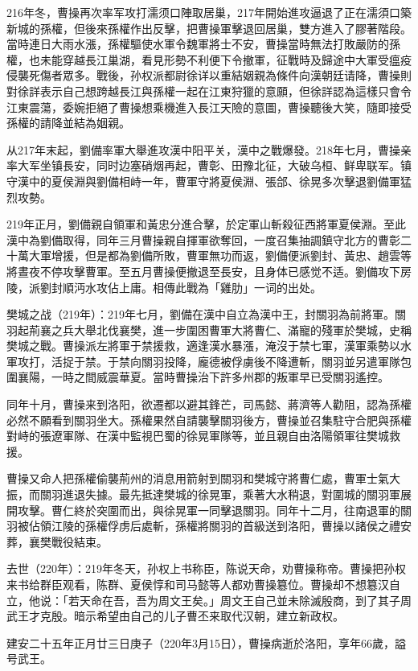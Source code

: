 216年冬，曹操再次率军攻打濡须口陣取居巢，217年開始進攻逼退了正在濡須口築新城的孫權，但後來孫權作出反擊，把曹操軍擊退回居巢，雙方進入了膠著階段。當時連日大雨水漲，孫權驅使水軍令魏軍將士不安，曹操當時無法打敗嚴防的孫權，也未能穿越長江巢湖，看見形勢不利便下令撤軍，征戰時及歸途中大軍受瘟疫侵襲死傷者眾多。戰後，孙权派都尉徐详以重結姻親為條件向漢朝廷请降，曹操則對徐詳表示自己想跨越長江與孫權一起在江東狩獵的意願，但徐詳認為這樣只會令江東震蕩，委婉拒絕了曹操想乘機進入長江天險的意圖，曹操聽後大笑，隨即接受孫權的請降並結為姻親。

从217年末起，劉備率軍大舉進攻漢中阳平关，漢中之戰爆發。218年七月，曹操亲率大军坐镇長安，同时边塞硝烟再起，曹彰、田豫北征，大破乌桓、鲜卑联军。镇守漢中的夏侯淵與劉備相峙一年，曹軍守將夏侯淵、張郃、徐晃多次擊退劉備軍猛烈攻勢。

219年正月，劉備親自領軍和黃忠分進合擊，於定軍山斬殺征西將軍夏侯淵。至此漢中為劉備取得，同年三月曹操親自揮軍欲奪回，一度召集抽調鎮守北方的曹彰二十萬大軍增援，但是都為劉備所敗，曹軍無功而返，劉備便派劉封、黃忠、趙雲等將晝夜不停攻擊曹軍。至五月曹操便撤退至長安，且身体已感觉不适。劉備攻下房陵，派劉封順沔水攻佔上庸。相傳此戰為「雞肋」一词的出处。

樊城之战（219年）：219年七月，劉備在漢中自立為漢中王，封關羽為前將軍。關羽起荊襄之兵大舉北伐襄樊，進一步圍困曹軍大將曹仁、滿寵的殘軍於樊城，史稱樊城之戰。曹操派左將軍于禁援救，適逢漢水暴漲，淹沒于禁七軍，漢軍乘勢以水軍攻打，活捉于禁。于禁向關羽投降，龐德被俘虜後不降遭斬，關羽並另遣軍隊包圍襄陽，一時之間威震華夏。當時曹操治下許多州郡的叛軍早已受關羽遙控。

同年十月，曹操来到洛阳，欲遷都以避其鋒芒，司馬懿、蔣濟等人勸阻，認為孫權必然不願看到關羽坐大。孫權果然自請襲擊關羽後方，曹操並召集駐守合肥與孫權對峙的張遼軍隊、在漢中監視巴蜀的徐晃軍隊等，並且親自由洛陽領軍往樊城救援。

曹操又命人把孫權偷襲荊州的消息用箭射到關羽和樊城守將曹仁處，曹軍士氣大振，而關羽進退失據。最先抵達樊城的徐晃軍，乘著大水稍退，對圍城的關羽軍展開攻擊。曹仁終於突圍而出，與徐晃軍一同擊退關羽。同年十二月，往南退軍的關羽被佔領江陵的孫權俘虏后處斬，孫權將關羽的首級送到洛阳，曹操以諸侯之禮安葬，襄樊戰役結束。

去世（220年）：219年冬天，孙权上书称臣，陈说天命，劝曹操称帝。曹操把孙权来书给群臣观看，陈群、夏侯惇和司马懿等人都劝曹操簒位。曹操却不想簒汉自立，他说：「若天命在吾，吾为周文王矣。」周文王自己並未除滅殷商，到了其子周武王才克殷。暗示希望由自己的儿子曹丕来取代汉朝，建立新政权。

建安二十五年正月廿三日庚子（220年3月15日），曹操病逝於洛阳，享年66歲，謚号武王。

